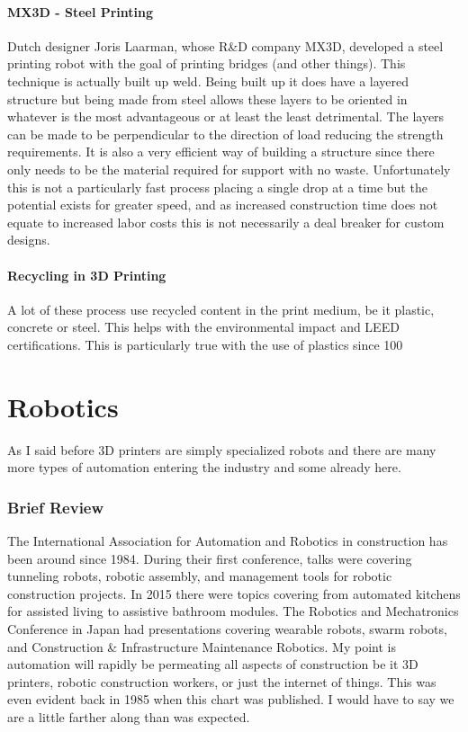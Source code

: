 \documentclass[11pt]{article}
\begin{document}
\paragraph{MX3D - Steel Printing}
Dutch designer Joris Laarman, whose R\&D company MX3D, developed a steel printing robot with the goal of printing bridges (and other things).  This technique is actually built up weld.  Being built up it does have a layered structure but being made from steel allows these layers to be oriented in whatever is the most advantageous or at least the least detrimental.  The layers can be made to be perpendicular to the direction of load reducing the strength requirements.  It is also a very efficient way of building a structure since there only needs to be the material required for support with no waste.  Unfortunately this is not a particularly fast process placing a single drop at a time but the potential exists for greater speed, and as increased construction time does not equate to increased labor costs this is not necessarily a deal breaker for custom designs.
\paragraph{Recycling in 3D Printing}
A lot of these process use recycled content in the print medium, be it plastic, concrete or steel.  This helps with the environmental impact and LEED certifications.  This is particularly true with the use of plastics since 100%
\section{Robotics}
As I said before 3D printers are simply specialized robots and there are many more types of automation entering the industry and some already here.  
\subsubsection{Brief Review}
The International Association for Automation and Robotics in construction has been around since 1984.  During their first conference, talks were covering tunneling robots, robotic assembly, and management tools for robotic construction projects.  In 2015 there were topics covering from automated kitchens for assisted living to assistive bathroom modules.  The Robotics and Mechatronics Conference in Japan had presentations covering wearable robots, swarm robots, and Construction \& Infrastructure Maintenance Robotics.  My point is automation will rapidly be permeating all aspects of construction be it 3D printers, robotic construction workers, or just the internet of things.  This was even evident back in 1985 when this chart was published.  I would have to say we are a little farther along than was expected.
\end{document}
